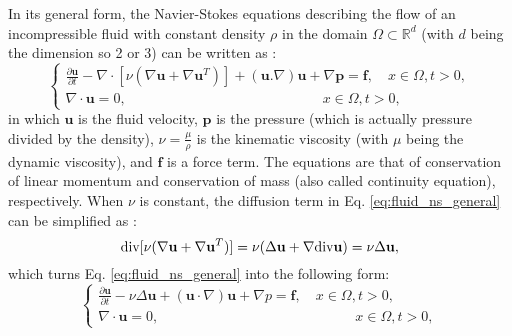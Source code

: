 In its general form, the Navier-Stokes equations describing the flow of an incompressible fluid with constant density $\rho$ in the domain $\Omega \subset \mathbb{R}^{d}$ (with $d$ being the dimension so 2 or 3) can be written as \cite{Chung2014}:
\begin{equation} \label{eq:fluid_ns_general}
\left\{ {\begin{array}{*{20}{l}}
\displaystyle  {\frac{{\partial {\mathbf{u}}}}{{\partial t}} - {\nabla\cdot}[\nu(\nabla {\mathbf{u}} + \nabla {{\mathbf{u}}^T})] + ({\mathbf{u}}.\nabla ){\mathbf{u}} + \nabla {\mathbf{p}} = {\mathbf{f}},\quad x \in \Omega ,t > 0,} \\ 
\displaystyle  {\nabla\cdot{\mathbf{u}} = 0,\quad \quad \quad \quad \quad \quad \quad \quad \quad \quad \quad \quad \quad \quad x \in \Omega ,t > 0,} 
\end{array}} \right.
\end{equation}
in which $\mathbf{u}$ is the fluid velocity, $\mathbf{p}$ is the pressure (which is actually pressure divided by the density), $\nu = \frac{\mu}{\rho}$ is the kinematic viscosity (with $\mu$ being the dynamic viscosity), and 
$\mathbf{f}$ is a force term. The equations are that of conservation of linear momentum and conservation of mass (also called continuity equation), respectively. When $\nu$ is constant, the diffusion term in Eq. \ref{eq:fluid_ns_general} can be simplified as \cite{Quarteroni2014}:
\begin{equation}
\text{div} [\nu(\nabla {\bf u}+\nabla {\bf u}^{T})] =\nu (\Delta {\bf u} + \nabla \text{div} {\bf u})=\nu \Delta {\bf u},
\end{equation}
which turns Eq. \ref{eq:fluid_ns_general} into the following form:
\begin{equation}  \label{eq:fluid_ns}
\left\{ {\begin{array}{*{20}{l}}
\displaystyle  {\frac{{\partial {\mathbf{u}}}}{{\partial t}} - \nu\Delta{\mathbf{u}} + \left( {{\mathbf{u}} \cdot \nabla } \right) {\mathbf{u}} + \nabla p = {\mathbf{f}},\quad x \in \Omega ,t > 0,} \\ 
 \displaystyle {\nabla\cdot{\mathbf{u}} = 0,\quad \quad \quad \quad \quad \quad \quad \quad \quad \quad \quad \quad \quad \quad x \in \Omega ,t > 0,} 
\end{array}} \right.
\end{equation}

